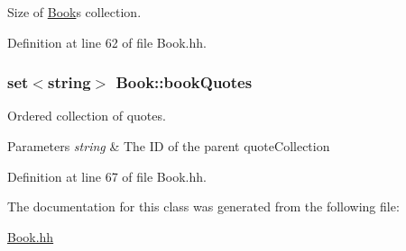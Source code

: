 Size of \hyperlink{class_book}{Book}\textquotesingle{}s collection. 



Definition at line 62 of file Book.\+hh.

\subsubsection[{\texorpdfstring{book\+Quotes}{bookQuotes}}]{\setlength{\rightskip}{0pt plus 5cm}set$<$string$>$ Book\+::book\+Quotes\hspace{0.3cm}{\ttfamily [private]}}\hypertarget{class_book_a370478eab144c20de936e1b68923e1c0}{}\label{class_book_a370478eab144c20de936e1b68923e1c0}


Ordered collection of quotes. 


\begin{DoxyParams}{Parameters}
{\em string} & The ID of the parent quote\+Collection \\
\hline
\end{DoxyParams}


Definition at line 67 of file Book.\+hh.



The documentation for this class was generated from the following file\+:\begin{DoxyCompactItemize}
\item 
\hyperlink{_book_8hh}{Book.\+hh}\end{DoxyCompactItemize}
